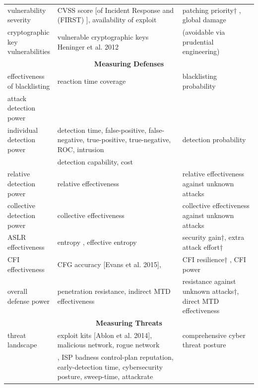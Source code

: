 \begin{tiny}
\begin{longtable}{@{}|p{0.2\linewidth}|p{0.5\linewidth}|p{0.3\linewidth}|@{}}
vulnerability severity & CVSS score {[}of Incident Response and (FIRST) {]}, availability of exploit \cite{Bilge_Dumitras_2012}  & patching priority† , global damage \\
cryptographic key vulnerabilities & vulnerable cryptographic keys \cite{Yilek_Rescorla_Shacham_Enright_Savage_2009, durumeric2014a} Heninger et al. 2012 & (avoidable via prudential engineering) \\* \midrule
 \multicolumn{3}{c}{\textbf{Measuring Defenses} } \\* \midrule
effectiveness of blacklisting & reaction time  \cite{Kuhrer_Rossow_Holz_2014} coverage\cite{Kuhrer_Rossow_Holz_2014}  & blacklisting probability  \\
attack detection power &  &  \\
individual detection power & detection time\cite{Rajab_Monrose_Terzis_2005}, false-positive, false-negative, true-positive, true-negative, ROC, intrusion & detection probability \\
 & detection capability\cite{Gu_Cardenas_Lee_2008}, cost\cite{Gaffney} &  \\
relative detection power & relative effectiveness\cite{Boggs_Stolfo_2011, Boggs_Du_Stolfo_2014} & relative effectiveness against unknown attacks \\
collective detection power & collective effectiveness \cite{Boggs_Stolfo_2011, Morales_Xu_Sandhu_2012, Boggs_Du_Stolfo_2014, Mohaisen_Alrawi_2014, Yardon_2014}& collective effectiveness against unknown attacks \\
ASLR effectiveness & entropy \cite{Shacham_Page_Pfaff_Goh_Modadugu_Boneh_2004}, effective entropy\cite{Herlands_Hobson_Donovan_2014} & security gain†, extra attack effort† \\
CFI effectiveness & CFG accuracy {[}Evans et al. 2015{]}, & CFI resilience† , CFI power  \\
overall defense power & penetration resistance\cite{Levin_2003}, indirect MTD effectiveness\cite{Han_Lu_Xu_2014}& resistance against unknown attacks†, direct MTD effectiveness \\* \midrule
 \multicolumn{3}{c}{\textbf{Measuring Threats}} \\* \midrule
threat landscape & exploit kits {[}Ablon et al. 2014{]}, malicious network\cite{Zhang_Zhang_Ou_2014}, rogue network & comprehensive cyber threat posture \\
 &\cite{Stone-Gross_Kruegel_Almeroth_Moser_Kirda_2009}, ISP badness \cite{Johnson_Chuang_Grossklags_Christin_2012} control-plan reputation\cite{Konte_Perdisci_Feamster_2015}, early-detection time\cite{Konte_Perdisci_Feamster_2015}, cybersecurity posture\cite{Zhan_Xu_Xu_2015}, sweep-time\cite{Zhan_Xu_Xu_2015}, attackrate \cite{Zhan_Xu_Xu_2015} &  \\

\end{longtable}
\end{tiny}
